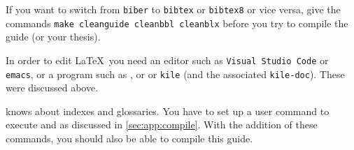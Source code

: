 If you want to switch from \texttt{biber} to
\texttt{bibtex} or \texttt{bibtex8} or vice versa, give the commands
\texttt{make cleanguide cleanbbl cleanblx} before you try to compile
the guide (or your thesis).

In order to edit \LaTeX\ you need an editor such as
\texttt{Visual Studio Code} or \texttt{emacs}, or
a program such as , \TeXstudio or \TeXmaker or
\texttt{kile} (and the associated \texttt{kile-doc}).
These were discussed above.

\TeXstudio knows about indexes and glossaries. You have to set up a
user command to execute  and 
as discussed in \cref{sec:app:compile}. With the addition of
these commands, you should also be able to compile this guide.

